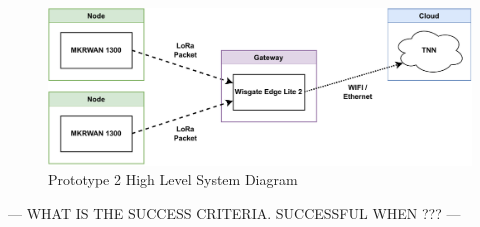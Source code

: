 \begin{figure}[h] 
	\centering
	\caption{Prototype 2 High Level System Diagram}
	\label{Proto2HLSD}
	\includegraphics[scale=0.8]{Sections/Introduction/Prototype-2-High-Level.drawio.pdf}
\end{figure}

--- WHAT IS THE SUCCESS CRITERIA. SUCCESSFUL WHEN ??? ---
